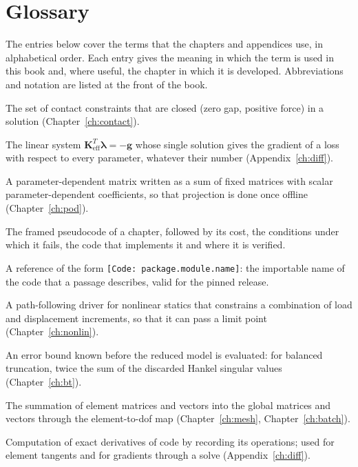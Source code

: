 \chapter{Glossary}\label{ch:gloss}

\label{sec:gloss}

The entries below cover the terms that the chapters and appendices use, in alphabetical order. Each entry gives the meaning in which the term is used in this book and, where useful, the chapter in which it is developed. Abbreviations and notation are listed at the front of the book.

\begin{description}\small
\item[Active set] The set of contact constraints that are closed (zero gap, positive force) in a solution (Chapter~\ref{ch:contact}).
\item[Adjoint system] The linear system $\bm K_{\mathrm{eff}}^T\bm\lambda=-\bm g$ whose single solution gives the gradient of a loss with respect to every parameter, whatever their number (Appendix~\ref{ch:diff}).
\item[Affine decomposition] A parameter-dependent matrix written as a sum of fixed matrices with scalar parameter-dependent coefficients, so that projection is done once offline (Chapter~\ref{ch:pod}).
\item[Algorithm box] The framed pseudocode of a chapter, followed by its cost, the conditions under which it fails, the code that implements it and where it is verified.
\item[Anchor, code anchor] A reference of the form \texttt{[Code: package.module.name]}: the importable name of the code that a passage describes, valid for the pinned release.
\item[Arc-length method] A path-following driver for nonlinear statics that constrains a combination of load and displacement increments, so that it can pass a limit point (Chapter~\ref{ch:nonlin}).
\item[A priori bound] An error bound known before the reduced model is evaluated: for balanced truncation, twice the sum of the discarded Hankel singular values (Chapter~\ref{ch:bt}).
\item[Assembly] The summation of element matrices and vectors into the global matrices and vectors through the element-to-dof map (Chapter~\ref{ch:mesh}, Chapter~\ref{ch:batch}).
\item[Automatic differentiation (autograd)] Computation of exact derivatives of code by recording its operations; used for element tangents and for gradients through a solve (Appendix~\ref{ch:diff}).

\end{description}
